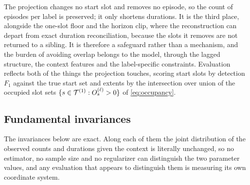 \begin{remark}
\label{rem:projection_is_a_safeguard}
The projection changes no start slot and removes no episode, so the count of
episodes per label is preserved; it only shortens durations. It is the third
place, alongside the one-slot floor and the horizon clip, where the
reconstruction can depart from exact duration reconciliation, because the slots
it removes are not returned to a sibling. It is therefore a
safeguard rather than a mechanism, and the burden of avoiding overlap belongs
to the model, through the lagged structure, the context features and the
label-specific constraints. Evaluation reflects both of the things the
projection touches, scoring start slots by detection $F_1$ against the true
start set and extents by the intersection over union of the occupied slot sets
$\{ s \in {\mathcal{T}}^{(1)} : O_s^{(\ell)} > 0 \}$ of \cref{eq:occupancy}.
\end{remark}

\subsection{Fundamental invariances}
\label{sec:invariances}

The invariances below are exact. Along each of them the joint distribution of
the observed counts and durations given the context is literally unchanged, so
no estimator, no sample size and no regularizer can distinguish the two
parameter values, and any evaluation that appears to distinguish them is
measuring its own coordinate system.

